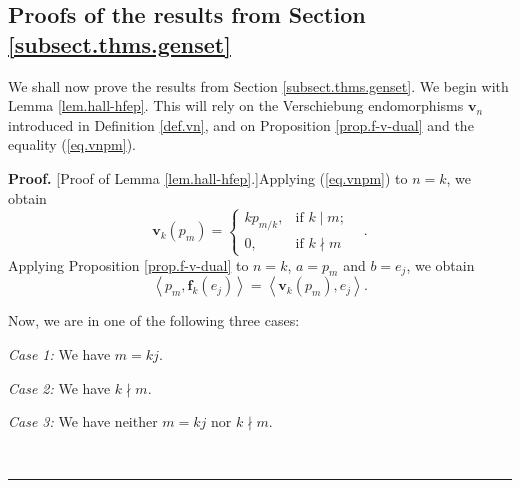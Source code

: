 \documentclass[numbers=enddot,12pt,final,onecolumn,notitlepage]{scrartcl}%
\theoremstyle{definition}
\newenvironment{proof}[1][Proof]{\noindent\textbf{#1.} }{\ \rule{0.5em}{0.5em}}
\begin{document}
\subsection{\label{subsect.proofs.Gkm-genset}Proofs of the results from
Section \ref{subsect.thms.genset}}

We shall now prove the results from Section \ref{subsect.thms.genset}. We
begin with Lemma \ref{lem.hall-hfep}. This will rely on the Verschiebung
endomorphisms $\mathbf{v}_{n}$ introduced in Definition \ref{def.vn}, and on
Proposition \ref{prop.f-v-dual} and the equality (\ref{eq.vnpm}).

\begin{proof}
[Proof of Lemma \ref{lem.hall-hfep}.]Applying (\ref{eq.vnpm}) to $n=k$, we
obtain%
\begin{equation}
\mathbf{v}_{k}\left(  p_{m}\right)  =%
\begin{cases}
kp_{m/k}, & \text{if }k\mid m;\\
0, & \text{if }k\nmid m
\end{cases}
\ \ \ \ . \label{pf.lem.hall-hfep.1}%
\end{equation}
Applying Proposition \ref{prop.f-v-dual} to $n=k$, $a=p_{m}$ and $b=e_{j}$, we
obtain%
\begin{equation}
\left\langle p_{m},\mathbf{f}_{k}\left(  e_{j}\right)  \right\rangle
=\left\langle \mathbf{v}_{k}\left(  p_{m}\right)  ,e_{j}\right\rangle .
\label{pf.lem.hall-hfep.2}%
\end{equation}


Now, we are in one of the following three cases:

\textit{Case 1:} We have $m=kj$.

\textit{Case 2:} We have $k\nmid m$.

\textit{Case 3:} We have neither $m=kj$ nor $k\nmid m$.


\end{proof}
\end{document}
